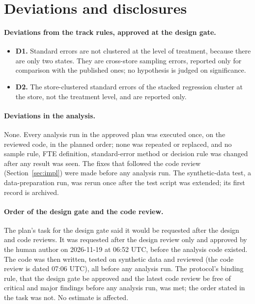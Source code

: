 \documentclass[11pt]{article}
\begin{document}
\section{Deviations and disclosures}
\label{sec:deviations}

\paragraph{Deviations from the track rules, approved at the design gate.}
\begin{itemize}
  \item \textbf{D1.} Standard errors are not clustered at the level of treatment, because
        there are only two states. They are cross-store sampling errors, reported only for
        comparison with the published ones; no hypothesis is judged on significance.
  \item \textbf{D2.} The store-clustered standard errors of the stacked regression cluster at
        the store, not the treatment level, and are reported only.
\end{itemize}

\paragraph{Deviations in the analysis.} None. Every analysis run in the approved plan was
executed once, on the reviewed code, in the planned order; none was repeated or replaced,
and no sample rule, FTE definition, standard-error method or decision rule was changed after
any result was seen. The fixes that followed the code review (Section~\ref{sec:impl}) were
made before any analysis run. The synthetic-data test, a data-preparation run, was rerun
once after the test script was extended; its first record is archived.

\paragraph{Order of the design gate and the code review.} The plan's task for the design
gate said it would be requested after the design and code reviews. It was requested after
the design review only and approved by the human author on 2026-11-19 at 06:52 UTC, before
the analysis code existed. The code was then written, tested on synthetic data and reviewed
(the code review is dated 07:06 UTC), all before any analysis run. The protocol's binding
rule, that the design gate be approved and the latest code review be free of critical and
major findings before any analysis run, was met; the order stated in the task was not. No
estimate is affected.
\end{document}
